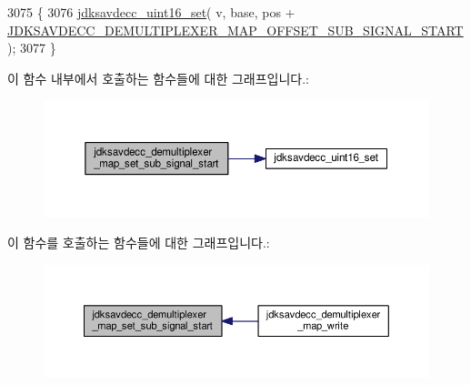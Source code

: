 \begin{DoxyCode}
3075 \{
3076     \hyperlink{group__endian_ga14b9eeadc05f94334096c127c955a60b}{jdksavdecc\_uint16\_set}( v, base, pos + 
      \hyperlink{group__demultiplexer__map_gafa458221cc97b8f53204b6311537ca2e}{JDKSAVDECC\_DEMULTIPLEXER\_MAP\_OFFSET\_SUB\_SIGNAL\_START} );
3077 \}
\end{DoxyCode}


이 함수 내부에서 호출하는 함수들에 대한 그래프입니다.\+:
\nopagebreak
\begin{figure}[H]
\begin{center}
\leavevmode
\includegraphics[width=350pt]{group__demultiplexer__map_ga31252ba4bc4b0624e0c4a9a4d349cccb_cgraph}
\end{center}
\end{figure}




이 함수를 호출하는 함수들에 대한 그래프입니다.\+:
\nopagebreak
\begin{figure}[H]
\begin{center}
\leavevmode
\includegraphics[width=350pt]{group__demultiplexer__map_ga31252ba4bc4b0624e0c4a9a4d349cccb_icgraph}
\end{center}
\end{figure}


